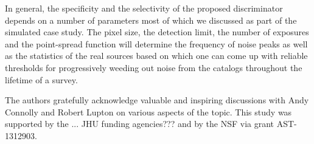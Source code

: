 \documentclass[twocolumn]{emulateapj}
\begin{document}
In general, the specificity and the selectivity of the proposed discriminator depends on a number of parameters most of which we discussed as part of the simulated case study. The pixel size, the detection limit, the number of exposures and the point-spread function will determine the frequency of noise peaks as well as the statistics of the real sources based on which one can come up with reliable thresholds for progressively weeding out noise from the catalogs throughout the lifetime of a survey.


\acknowledgements{}
The authors gratefully acknowledge valuable and inspiring discussions with Andy Connolly and Robert Lupton on various aspects of the topic.
This study was supported by the ... {\color{red}JHU funding agencies???} and by the NSF via grant AST-1312903.

\color{black}
\end{document}
